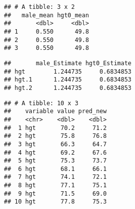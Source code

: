 \documentclass[
]{book}
\newenvironment{Shaded}{\begin{snugshade}}{\end{snugshade}}
\newcommand{\DataTypeTok}[1]{\textcolor[rgb]{0.13,0.29,0.53}{#1}}
\newcommand{\DecValTok}[1]{\textcolor[rgb]{0.00,0.00,0.81}{#1}}
\newcommand{\KeywordTok}[1]{\textcolor[rgb]{0.13,0.29,0.53}{\textbf{#1}}}
\newcommand{\NormalTok}[1]{#1}
\newcommand{\OperatorTok}[1]{\textcolor[rgb]{0.81,0.36,0.00}{\textbf{#1}}}
\newcommand{\StringTok}[1]{\textcolor[rgb]{0.31,0.60,0.02}{#1}}
\begin{document}
\begin{verbatim}
## # A tibble: 3 x 2
##   male_mean hgt0_mean
##       <dbl>     <dbl>
## 1     0.550      49.8
## 2     0.550      49.8
## 3     0.550      49.8
\end{verbatim}

\begin{Shaded}
\end{Shaded}

\begin{verbatim}
##       male_Estimate hgt0_Estimate
## hgt        1.244735     0.6834853
## hgt.1      1.244735     0.6834853
## hgt.2      1.244735     0.6834853
\end{verbatim}

\begin{Shaded}
\end{Shaded}

\begin{verbatim}
## # A tibble: 10 x 3
##    variable value pred_new
##    <chr>    <dbl>    <dbl>
##  1 hgt       70.2     71.2
##  2 hgt       75.8     76.8
##  3 hgt       66.3     64.7
##  4 hgt       69.2     67.6
##  5 hgt       75.3     73.7
##  6 hgt       68.1     66.1
##  7 hgt       74.1     72.1
##  8 hgt       77.1     75.1
##  9 hgt       71.5     69.0
## 10 hgt       77.8     75.3
\end{verbatim}
\end{document}
